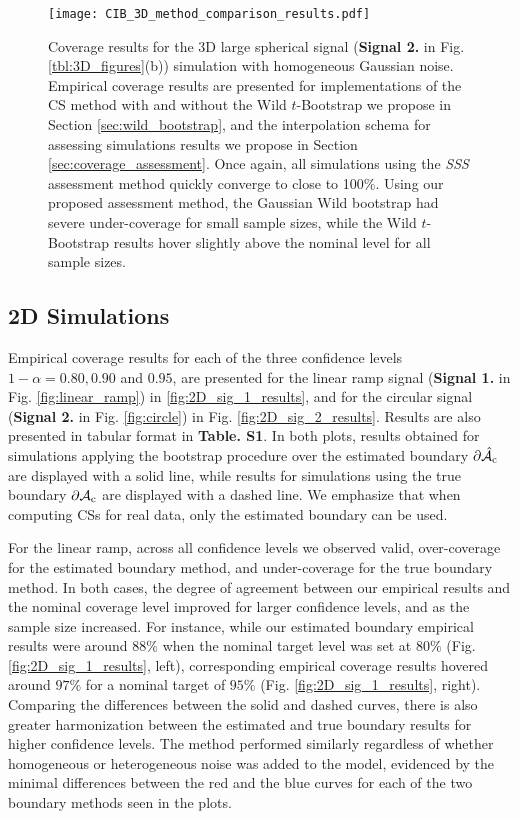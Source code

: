 \begin{figure}[htbp]
\hspace*{-1.5cm}
    \texttt{[image: CIB\_3D\_method\_comparison\_results.pdf]}
\caption{Coverage results for the 3D large spherical signal (\textbf{Signal 2.} in Fig. \ref{tbl:3D_figures}(b)) simulation with homogeneous Gaussian noise. Empirical coverage results are presented for implementations of the CS method with and without the Wild $t$-Bootstrap we propose in Section \ref{sec:wild_bootstrap}, and the interpolation schema for assessing simulations results we propose in Section \ref{sec:coverage_assessment}. Once again, all simulations using the \textit{SSS} assessment method quickly converge to close to 100\%. Using our proposed assessment method, the Gaussian Wild bootstrap had severe under-coverage for small sample sizes, while the Wild $t$-Bootstrap results hover slightly above the nominal level for all sample sizes.}
\label{fig:3D_method_comparisons}
\end{figure}

\subsection{2D Simulations}
\label{sec:2D_simulation_results}
Empirical coverage results for each of the three confidence levels $1 - \alpha = 0.80, 0.90$ and $0.95$, are presented for the linear ramp signal (\textbf{Signal 1.} in Fig. \ref{fig:linear_ramp}) in \ref{fig:2D_sig_1_results}, and for the circular signal (\textbf{Signal 2.} in Fig. \ref{fig:circle}) in Fig. \ref{fig:2D_sig_2_results}. Results are also presented in tabular format in \textbf{Table. S1}.
In both plots, results obtained for simulations applying the bootstrap procedure over the estimated boundary $\operatorname{\partial\hat{\mathcal{A}}_{c}}$ are displayed with a solid line, while results for simulations using the true boundary $\operatorname{\partial\mathcal{A}_{c}}$ are displayed with a dashed line. We emphasize that when computing CSs for real data, only the estimated boundary can be used. 

For the linear ramp, across all confidence levels we observed valid, over-coverage for the estimated boundary method, and under-coverage for the true boundary method. In both cases, the degree of agreement between our empirical results and the nominal coverage level improved for larger confidence levels, and as the sample size increased. For instance, while our estimated boundary empirical results were around $88\%$ when the nominal target level was set at $80\%$  (Fig. \ref{fig:2D_sig_1_results}, left), corresponding empirical coverage results hovered around $97\%$ for a nominal target of $95\%$ (Fig. \ref{fig:2D_sig_1_results}, right). Comparing the differences between the solid and dashed curves, there is also greater harmonization between the estimated and true boundary results for higher confidence levels. The method performed similarly regardless of whether homogeneous or heterogeneous noise was added to the model, evidenced by the minimal differences between the red and the blue curves for each of the two boundary methods seen in the plots. 

